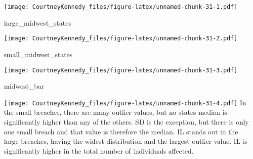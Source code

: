 \documentclass[
]{article}
\newenvironment{Shaded}{\begin{snugshade}}{\end{snugshade}}
\newcommand{\NormalTok}[1]{#1}
\begin{document}
\texttt{[image: CourtneyKennedy\_files/figure-latex/unnamed-chunk-31-1.pdf]}

\begin{Shaded}
\begin{Highlighting}[]
\NormalTok{large\_midwest\_states}
\end{Highlighting}
\end{Shaded}

\texttt{[image: CourtneyKennedy\_files/figure-latex/unnamed-chunk-31-2.pdf]}

\begin{Shaded}
\begin{Highlighting}[]
\NormalTok{small\_midwest\_states}
\end{Highlighting}
\end{Shaded}

\texttt{[image: CourtneyKennedy\_files/figure-latex/unnamed-chunk-31-3.pdf]}

\begin{Shaded}
\begin{Highlighting}[]
\NormalTok{midwest\_bar}
\end{Highlighting}
\end{Shaded}

\texttt{[image: CourtneyKennedy\_files/figure-latex/unnamed-chunk-31-4.pdf]}
In the small breaches, there are many outlier values, but no states
median is significantly higher than any of the others. SD is the
exception, but there is only one small breach and that value is
therefore the median. IL stands out in the large breaches, having the
widest distribution and the largest outlier value. IL is significantly
higher in the total number of individuals affected.
\end{document}
